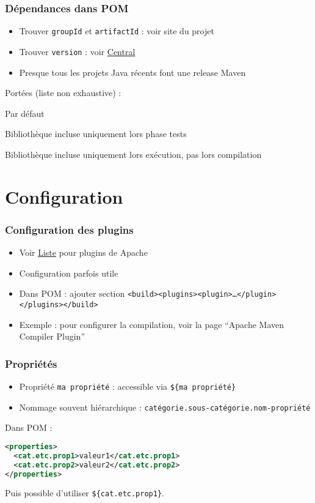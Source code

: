 \documentclass[english, french]{beamer}
\begin{document}
\begin{frame}
	\frametitle{Dépendances dans POM}
	\begin{itemize}
		\item Trouver \texttt{groupId} et \texttt{artifactId} : voir site du projet
		\item Trouver \texttt{version} : voir \href{https://search.maven.org}{Central}
		\item Presque tous les projets Java récents font une release Maven
	\end{itemize}
	Portées {\tiny (liste non exhaustive)} :
	\begin{description}
		\item[\texttt{compile}] Par défaut
		\item[\texttt{test}] Bibliothèque incluse uniquement lors phase tests
		\item[\texttt{runtime}] Bibliothèque incluse uniquement lors exécution, pas lors compilation
	\end{description}
\end{frame}

\section{Configuration}
\begin{frame}
	\frametitle{Configuration des plugins}
	\begin{itemize}
		\item Voir \href{https://maven.apache.org/plugins/index.html}{Liste} pour plugins de Apache
		\item Configuration parfois utile
		\item Dans POM : ajouter section \texttt{<build><plugins><plugin>…</plugin></plugins></build>}
		\item Exemple : pour configurer la compilation, voir la page “Apache Maven Compiler Plugin”
	\end{itemize}
\end{frame}

\begin{frame}[fragile]
	\frametitle{Propriétés}
	\begin{itemize}
		\item Propriété \texttt{ma propriété} : accessible via \texttt{\$\{ma propriété\}}
		\item Nommage souvent hiérarchique : \texttt{catégorie.sous-catégorie.nom-propriété}
	\end{itemize}
	Dans POM : 
	\begin{lstlisting}[keywordstyle=\fontspec{Latin Modern Mono Light}\textbf, emph={project, modelVersion, groupId, artifactId, version}, emphstyle=\fontspec{Latin Modern Mono Light}\textbf, language=XML, basicstyle=\small\NoAutoSpacing\ttfamily, showstringspaces=false]
<properties>
  <cat.etc.prop1>valeur1</cat.etc.prop1>
  <cat.etc.prop2>valeur2</cat.etc.prop2>
</properties>
\end{lstlisting}
	
	Puis possible d’utiliser \texttt{\$\{cat.etc.prop1\}}.
\end{frame}
\end{document}
